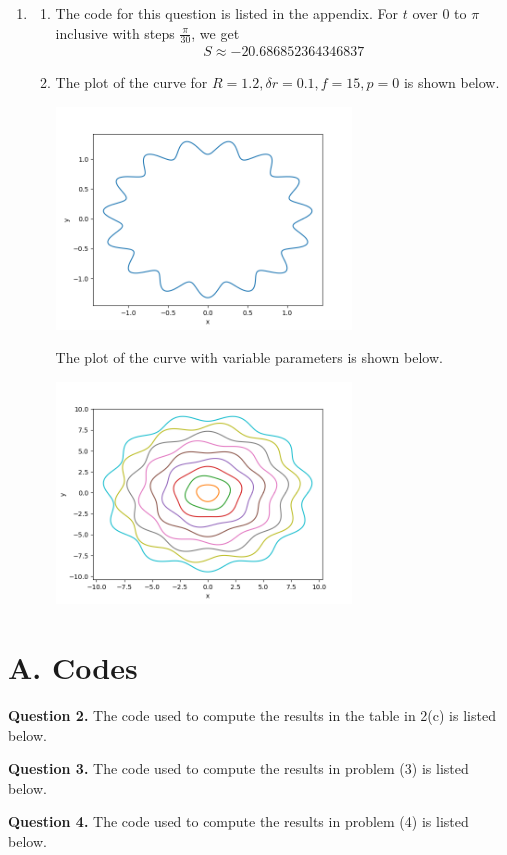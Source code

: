 \documentclass[10pt]{article}
\begin{document}
\begin{enumerate}
    \item \begin{enumerate}
      \item The code for this question is listed in the appendix. For \(t\) over 0 to $\pi$ inclusive with steps \(\frac{\pi}{30}\), we get \begin{align*}
          S \approx -20.686852364346837
      \end{align*}

      \item The plot of the curve for \(R=1.2, \delta r=0.1, f=15, p=0\) is shown below.
      
      \begin{center}
        \includegraphics[width=0.65\textwidth]{hw2_3_b1.png}
      \end{center}

      The plot of the curve with variable parameters is shown below.
      \begin{center}
        \includegraphics[width=0.65\textwidth]{hw2_3_b2.png}
      \end{center}

    \end{enumerate}

\end{enumerate}
\section*{A. Codes}
\textbf{Question 2.} The code used to compute the results in the table in 2(c) is listed below.
{\small }

\noindent\textbf{Question 3.} The code used to compute the results in problem (3) is listed below.
{\small }

\noindent\textbf{Question 4.} The code used to compute the results in problem (4) is listed below.
{\small }
\end{document}
